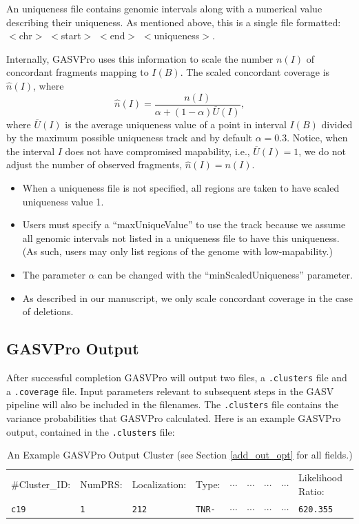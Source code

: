 \documentclass[11pt]{article}
\begin{document}
An uniqueness file contains genomic intervals along with a numerical value describing their uniqueness. As mentioned above, this is a single file formatted: $<$chr$>$ $<$start$>$ $<$end$>$ $<$uniqueness$>$. 

Internally, GASVPro uses this information to scale the number $n(I)$ of concordant fragments mapping to $I(B)$. The scaled  concordant coverage is $\hat{n}(I)$, where
\begin{equation}
\hat{n}(I)= \frac{n(I)}{\alpha + (1-\alpha) \overline{U}(I)},
\end{equation}
\noindent where $\overline{U}(I)$ is the average uniqueness value of a point in interval $I(B)$ divided by the maximum possible uniqueness track and by default  $\alpha = 0.3$. Notice, when the interval $I$ does not have compromised mapability, i.e., $\overline{U}(I) = 1$, we do not adjust the number of observed fragments, $\hat{n}(I) = n(I)$.

\begin{itemize}
\item When a uniqueness file is not specified, all regions are taken to have scaled uniqueness value 1.
\item Users must specify a ``maxUniqueValue'' to use the track because we assume all genomic intervals not listed in a uniqueness file to have this uniqueness. (As such, users may only list regions of the genome with low-mapability.)
\item The parameter $\alpha$ can be changed with the ``minScaledUniqueness'' parameter.
\item As described in our manuscript, we only scale concordant coverage in the case of deletions.  
\end{itemize}




\subsection{GASVPro Output}
After successful completion GASVPro will output two files, a \verb+.clusters+ file and a \verb+.coverage+ file. Input parameters relevant to subsequent steps in the GASV pipeline will also be included in the filenames. The \verb+.clusters+ file contains the variance probabilities that GASVPro calculated. Here is an example GASVPro output, contained in the \verb+.clusters+ file:
\begin{table}[h]\small
   \centering
   \begin{tabular}{lllllllll} %
 \#Cluster\_ID:  &  NumPRS:   &  Localization: & Type:  &  $\cdots$    &     $\cdots$  & $\cdots$  &  $\cdots$ & Likelihood Ratio:\\
		\verb+c19+  &  \verb+1+  &    \verb+212+   &    \verb+TNR-+     & $\cdots$   &    $\cdots$  &     $\cdots$&    $\cdots$ & \verb+620.355+
    \end{tabular}
   \caption{An Example GASVPro Output Cluster (see Section \ref{add_out_opt} for all fields.)}
   \label{tab:booktabs}
\end{table}
\end{document}

